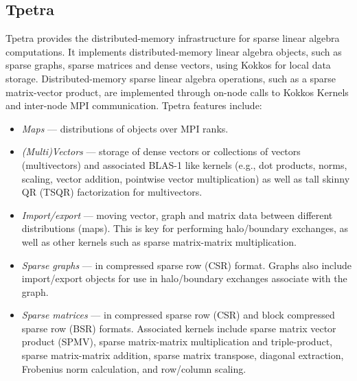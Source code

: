 \subsection{Tpetra}\label{subsec:tpetra}
Tpetra \cite{hoemmen2015tpetra} provides the distributed-memory
infrastructure for sparse linear algebra computations.  It implements
distributed-memory linear algebra objects, such as sparse graphs,
sparse matrices and dense vectors, using Kokkos for local data
storage.  Distributed-memory sparse linear algebra operations, such as
a sparse matrix-vector product, are implemented through on-node calls
to Kokkos Kernels and inter-node MPI communication.   Tpetra features
include:
\begin{itemize}
\item \textit{Maps} --- distributions of objects over MPI ranks.
\item \textit{(Multi)Vectors} --- storage of dense vectors or collections of
vectors (multivectors) and associated BLAS-1 like kernels (e.g., dot
products, norms, scaling, vector addition, pointwise vector
multiplication) as well as tall skinny QR (TSQR)  factorization for multivectors.
\item \textit{Import/export} --- moving vector, graph and matrix data
between different distributions (maps).  This is key for performing
halo/boundary exchanges, as well as other kernels such as
sparse matrix-matrix multiplication.
\item \textit{Sparse graphs} --- in compressed sparse row (CSR)
format.  Graphs also include import/export objects for use in
halo/boundary exchanges associate with the graph.
\item \textit{Sparse matrices} --- in compressed sparse row (CSR) and
block compressed sparse row (BSR) formats.  Associated kernels include
sparse matrix vector product (SPMV), sparse matrix-matrix
multiplication and triple-product, sparse matrix-matrix addition, sparse matrix transpose, diagonal extraction,
Frobenius norm calculation, and row/column scaling.
\end{itemize}
